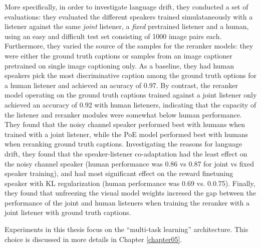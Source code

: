 More specifically, in order to investigate language drift, they conducted a set of evaluations: they evaluated the different speakers trained simulataneously with a listener against the same \textit{joint} listener, a \textit{fixed} pretrained listener and a human, using an easy and difficult test set consisting of 1000 image pairs each. Furthermore, they varied the source of the samples for the reranker models: they were either the ground truth captions or samples from an image captioner pretrained on single image captioning only. As a baseline, they had human speakers pick the most discriminative caption among the ground truth options for a human listener and achieved an acuracy of 0.97. By contrast, the reranker model operating on the ground truth captions trained against a joint listener only achieved an accuracy of 0.92 with human listeners, indicating that the capacity of the listener and reranker modules were somewhat below human performance. They found that the noisy channel speaker performed best with humans when trained with a joint listener, while the PoE model performed best with humans when reranking ground truth captions. Investigating the reasons for language drift, they found that the speaker-listener co-adaptation had the least effect on the noisy channel speaker (human performance was 0.86 vs 0.87 for joint vs fixed speaker training), and had most significant effect on the reward finetuning speaker with KL regularization (human performance was 0.69 vs. 0.0.75). Finally, they found that unfreezing the visual model weights incresed the gap between the performance of the joint and human listeners when training the reranker with a joint listener with ground truth captions. 

Experiments in this thesis focus on the ``multi-task learning'' architecture. This choice is discussed in more details in Chapter \ref{chapter05}.


